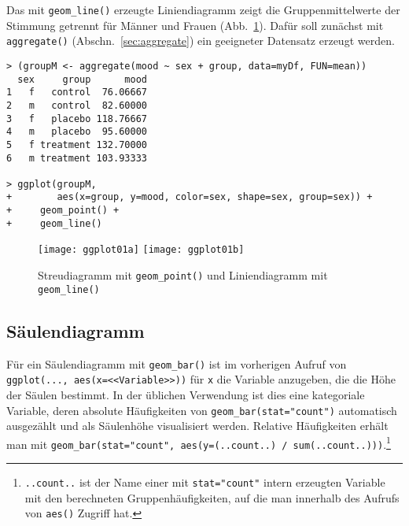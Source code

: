 Das mit \lstinline!geom_line()! erzeugte Liniendiagramm zeigt die Gruppenmittelwerte der Stimmung getrennt für Männer und Frauen (Abb.\ \ref{fig:ggplot01}). Dafür soll zunächst mit \lstinline!aggregate()! (Abschn.\ \ref{sec:aggregate}) ein geeigneter Datensatz erzeugt werden.
\begin{lstlisting}
> (groupM <- aggregate(mood ~ sex + group, data=myDf, FUN=mean))
  sex     group      mood
1   f   control  76.06667
2   m   control  82.60000
3   f   placebo 118.76667
4   m   placebo  95.60000
5   f treatment 132.70000
6   m treatment 103.93333

> ggplot(groupM,
+        aes(x=group, y=mood, color=sex, shape=sex, group=sex)) +
+     geom_point() +
+     geom_line()
\end{lstlisting}

\begin{figure}[ht]
\centering
\texttt{[image: ggplot01a]}
\texttt{[image: ggplot01b]}
\vspace*{-0.5em}
\caption{Streudiagramm mit \lstinline!geom_point()! und Liniendiagramm mit \lstinline!geom_line()!}
\label{fig:ggplot01}
\end{figure}

\subsection{Säulendiagramm}

Für ein Säulendiagramm mit \lstinline!geom_bar()! ist im vorherigen Aufruf von \lstinline!ggplot(..., aes(x=<<Variable>>))! für \lstinline!x! die Variable anzugeben, die die Höhe der Säulen bestimmt. In der üblichen Verwendung ist dies eine kategoriale Variable, deren absolute Häufigkeiten von \lstinline!geom_bar(stat="count")! automatisch ausgezählt und als Säulenhöhe visualisiert werden. Relative Häufigkeiten erhält man mit \lstinline!geom_bar(stat="count", aes(y=(..count..) / sum(..count..)))!.\footnote{\label{ftn:ggplotCount}\lstinline!..count..! ist der Name einer mit \lstinline!stat="count"! intern erzeugten Variable mit den berechneten Gruppenhäufigkeiten, auf die man innerhalb des Aufrufs von \lstinline!aes()! Zugriff hat.}

